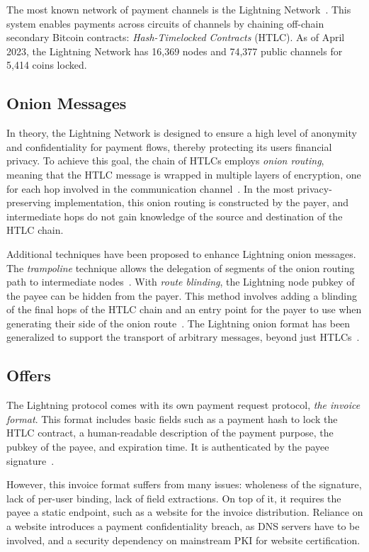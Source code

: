 \documentclass[pdflatex,sn-mathphys]{sn-jnl}%
\theoremstyle{thmstyleone}%
\theoremstyle{thmstyletwo}%
\theoremstyle{thmstylethree}%
\begin{document}
The most known network of payment channels is the Lightning Network~\cite{Lightning2016Poon}. This system enables payments across circuits of channels by chaining off-chain secondary Bitcoin contracts: \textit{Hash-Timelocked Contracts} (HTLC). As of April 2023, the Lightning Network has 16,369 nodes and 74,377 public channels for 5,414 coins locked.

\subsection{Onion Messages}

In theory, the Lightning Network is designed to ensure a high level of anonymity and confidentiality for payment flows, thereby protecting its users financial privacy. To achieve this goal, the chain of HTLCs employs \textit{onion routing}, meaning that the HTLC message is wrapped in multiple layers of encryption, one for each hop involved in the communication channel~\cite{Sphinx2010Kate}. In the most privacy-preserving implementation, this onion routing is constructed by the payer, and intermediate hops do not gain knowledge of the source and destination of the HTLC chain.

Additional techniques have been proposed to enhance Lightning onion messages. The \textit{trampoline} technique allows the delegation
of segments of the onion routing path to intermediate nodes~\cite{Trampoline2021Teinturier}. With \textit{route blinding}, the Lightning node pubkey of the payee can be hidden from the payer. This method involves adding a blinding of the final hops of the HTLC chain and an entry point for the payer to use when generating their side of the onion route~\cite{Blinding2020Teinturier}. The Lightning onion format has been generalized to support the transport of arbitrary messages, beyond just HTLCs~\cite{Onion2020Russell}.

\subsection{Offers}

The Lightning protocol comes with its own payment request protocol, \textit{the invoice format}. This format includes basic fields such as a payment hash to lock the HTLC contract, a human-readable description of the payment purpose, the pubkey of the payee, and expiration time. It is authenticated by the payee signature~\cite{Invoice2017LNdevs}.

However, this invoice format suffers from many issues: wholeness of the signature, lack of per-user binding, lack of field extractions. On top of it, it requires the payee a static endpoint, such as a website for the invoice distribution. Reliance on a website introduces a payment confidentiality breach, as DNS servers have to be involved, and a security dependency on mainstream PKI for website certification.
\end{document}
